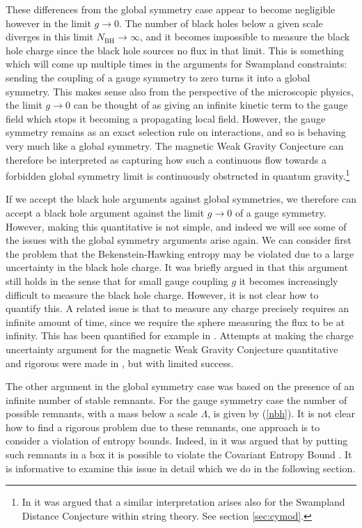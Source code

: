 \documentclass[11pt,a4paper]{article}
\numberwithin{equation}{section}
\numberwithin{table}{section}\setlength{\multlinegap}{25pt}
\begin{document}
These differences from the global symmetry case appear to become negligible however in the limit $g\rightarrow 0$. The number of black holes below a given scale diverges in this limit $N_{\mathrm{BH}} \rightarrow \infty$, and it becomes impossible to measure the black hole charge since the black hole sources no flux in that limit. This is something which will come up multiple times in the arguments for Swampland constraints: sending the coupling of a gauge symmetry to zero turns it into a global symmetry. This makes sense also from the perspective of the microscopic physics, the limit $g \rightarrow 0$ can be thought of as giving an infinite kinetic term to the gauge field which stops it becoming a propagating local field. However, the gauge symmetry remains as an exact selection rule on interactions, and so is behaving very much like a global symmetry. The magnetic Weak Gravity Conjecture can therefore be interpreted as capturing how such a continuous flow towards a forbidden global symmetry limit is continuously obstructed in quantum gravity.\footnote{In \cite{Grimm:2018ohb} it was argued that a similar interpretation arises also for the Swampland Distance Conjecture within string theory. See section \ref{sec:cymod}.}

If we accept the black hole arguments against global symmetries, we therefore can accept a black hole argument against the limit $g \rightarrow 0$ of a gauge symmetry. However, making this quantitative is not simple, and indeed we will see some of the issues with the global symmetry arguments arise again. We can consider first the problem that the Bekenstein-Hawking entropy may be violated due to a large uncertainty in the black hole charge. It was briefly argued in \cite{Banks:2006mm} that this argument still holds in the sense that for small gauge coupling $g$ it becomes increasingly difficult to measure the black hole charge. However, it is not clear how to quantify this. A related issue is that to measure any charge precisely requires an infinite amount of time, since we require the sphere measuring the flux to be at infinity. This has been quantified for example in \cite{Bousso:2017xyo}. Attempts at making the charge uncertainty argument for the magnetic Weak Gravity Conjecture quantitative and rigorous were made in \cite{Saraswat:2016eaz,Schadow}, but with limited success.   

The other argument in the global symmetry case was based on the presence of an infinite number of stable remnants. For the gauge symmetry case the number of possible remnants, with a mass below a scale $\Lambda$, is given by (\ref{nbh}). It is not clear how to find a rigorous problem due to these remnants, one approach is to consider a violation of entropy bounds. Indeed, in \cite{Banks:2006mm} it was argued that by putting such remnants in a box it is possible to violate the Covariant Entropy Bound \cite{Fischler:1998st,Bousso:1999xy}. It is informative to examine this issue in detail which we do in the following section.
\end{document}
